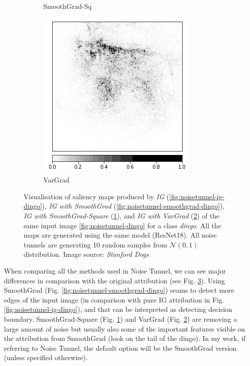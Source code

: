 \begin{figure}[h]
\begin{subfigure}{.19\textwidth}
    \caption{SmoothGrad-Sq}\label{fig:noisetunnel-smoothgrad-sq-dingo}
\end{subfigure}
 \begin{subfigure}{.19\textwidth}
    \centering
    \includegraphics[width=\textwidth]{methods/images/ig-vargrad-dingo.png}
    \caption{VarGrad}\label{fig:noisetunnel-vargrad-dingo}
\end{subfigure}

 \caption{Visualisation of saliency maps produced by \textit{IG} (\ref{fig:noisetunnel-ig-dingo}), \textit{IG with SmoothGrad} (\ref{fig:noisetunnel-smoothgrad-dingo}), \textit{IG with SmoothGrad-Square} (\ref{fig:noisetunnel-smoothgrad-sq-dingo}), and \textit{IG with VarGrad} (\ref{fig:noisetunnel-vargrad-dingo}) of the same input image \ref{fig:noisetunnel-dingo} for a class \textit{dingo}. All the maps are generated using the same model (ResNet18). All noise tunnels are generating 10 random samples from ${\mathcal {N}}(0,1)$ distribution. Image source: \textit{Stanford Dogs} \cite{stanford-dogs} }\label{fig:noisetunnel-comparison-dingo}
\end{figure}

When comparing all the methods used in Noise Tunnel, we can see major differences in comparison with the original attribution (see Fig. \ref{fig:noisetunnel-comparison-dingo}). Using SmoothGrad (Fig. \ref{fig:noisetunnel-smoothgrad-dingo}) seams to detect more edges of the input image (in comparison with pure IG attribution in Fig. \ref{fig:noisetunnel-ig-dingo}), and that can be interpreted as detecting decision boundary. SmoothGrad-Square (Fig. \ref{fig:noisetunnel-smoothgrad-sq-dingo}) and VarGrad (Fig. \ref{fig:noisetunnel-vargrad-dingo}) are removing a large amount of noise but usually also some of the important features visible on the attribution from SmoothGrad (look on the tail of the dingo). In my work, if referring to Noise Tunnel, the default option will be the SmoothGrad version (unless specified otherwise).